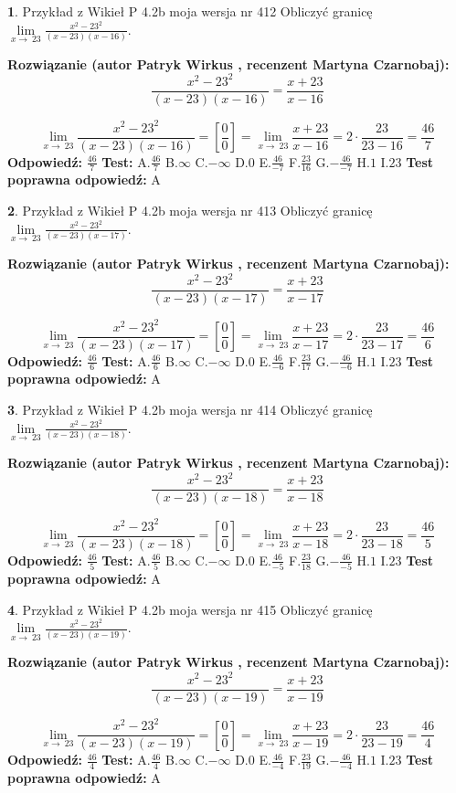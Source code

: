 \documentclass[12pt, a4paper]{article}
\theoremstyle{definition} %
\newtheorem{zad}{}
\newcommand{\zadStart}[1]{\begin{zad}#1\newline}
\newcommand{\zadStop}{\end{zad}}
\newcommand{\rozwStart}[2]{\noindent \textbf{Rozwiązanie (autor #1 , recenzent #2): }\newline}
\newcommand{\rozwStop}{\newline}
\newcommand{\odpStart}{\noindent \textbf{Odpowiedź:}\newline}
\newcommand{\odpStop}{\newline}
\newcommand{\testStart}{\noindent \textbf{Test:}\newline}
\newcommand{\testStop}{\newline}
\newcommand{\kluczStart}{\noindent \textbf{Test poprawna odpowiedź:}\newline}
\newcommand{\kluczStop}{\newline}
\begin{document}
\zadStart{Przykład z Wikieł P 4.2b moja wersja nr 412}
Obliczyć granicę $\lim\limits_{x\to\ 23}\frac{x^{2}-23^{2}}{(x-23)(x-16)}$.
\zadStop
\rozwStart{Patryk Wirkus}{Martyna Czarnobaj}
$$\frac{x^{2}-23^{2}}{(x-23)(x-16)}=\frac{x+23}{x-16}$$

$$\lim\limits_{x\to\ 23}\frac{x^{2}-23^{2}}{(x-23)(x-16)}=[\frac{0}{0}]=\lim\limits_{x\to\ 23}\frac{x+23}{x-16}=2 \cdot \frac{23}{23-16} = \frac{46}{7}$$
\rozwStop
\odpStart
$\frac{46}{7}$
\odpStop
\testStart
A.$\frac{46}{7}$
B.$\infty$
C.$-\infty$
D.$0$
E.$\frac{46}{-7}$
F.$\frac{23}{16}$
G.$-\frac{46}{-7}$
H.$1$
I.$23$
\testStop
\kluczStart
A
\kluczStop



\zadStart{Przykład z Wikieł P 4.2b moja wersja nr 413}
Obliczyć granicę $\lim\limits_{x\to\ 23}\frac{x^{2}-23^{2}}{(x-23)(x-17)}$.
\zadStop
\rozwStart{Patryk Wirkus}{Martyna Czarnobaj}
$$\frac{x^{2}-23^{2}}{(x-23)(x-17)}=\frac{x+23}{x-17}$$

$$\lim\limits_{x\to\ 23}\frac{x^{2}-23^{2}}{(x-23)(x-17)}=[\frac{0}{0}]=\lim\limits_{x\to\ 23}\frac{x+23}{x-17}=2 \cdot \frac{23}{23-17} = \frac{46}{6}$$
\rozwStop
\odpStart
$\frac{46}{6}$
\odpStop
\testStart
A.$\frac{46}{6}$
B.$\infty$
C.$-\infty$
D.$0$
E.$\frac{46}{-6}$
F.$\frac{23}{17}$
G.$-\frac{46}{-6}$
H.$1$
I.$23$
\testStop
\kluczStart
A
\kluczStop



\zadStart{Przykład z Wikieł P 4.2b moja wersja nr 414}
Obliczyć granicę $\lim\limits_{x\to\ 23}\frac{x^{2}-23^{2}}{(x-23)(x-18)}$.
\zadStop
\rozwStart{Patryk Wirkus}{Martyna Czarnobaj}
$$\frac{x^{2}-23^{2}}{(x-23)(x-18)}=\frac{x+23}{x-18}$$

$$\lim\limits_{x\to\ 23}\frac{x^{2}-23^{2}}{(x-23)(x-18)}=[\frac{0}{0}]=\lim\limits_{x\to\ 23}\frac{x+23}{x-18}=2 \cdot \frac{23}{23-18} = \frac{46}{5}$$
\rozwStop
\odpStart
$\frac{46}{5}$
\odpStop
\testStart
A.$\frac{46}{5}$
B.$\infty$
C.$-\infty$
D.$0$
E.$\frac{46}{-5}$
F.$\frac{23}{18}$
G.$-\frac{46}{-5}$
H.$1$
I.$23$
\testStop
\kluczStart
A
\kluczStop



\zadStart{Przykład z Wikieł P 4.2b moja wersja nr 415}
Obliczyć granicę $\lim\limits_{x\to\ 23}\frac{x^{2}-23^{2}}{(x-23)(x-19)}$.
\zadStop
\rozwStart{Patryk Wirkus}{Martyna Czarnobaj}
$$\frac{x^{2}-23^{2}}{(x-23)(x-19)}=\frac{x+23}{x-19}$$

$$\lim\limits_{x\to\ 23}\frac{x^{2}-23^{2}}{(x-23)(x-19)}=[\frac{0}{0}]=\lim\limits_{x\to\ 23}\frac{x+23}{x-19}=2 \cdot \frac{23}{23-19} = \frac{46}{4}$$
\rozwStop
\odpStart
$\frac{46}{4}$
\odpStop
\testStart
A.$\frac{46}{4}$
B.$\infty$
C.$-\infty$
D.$0$
E.$\frac{46}{-4}$
F.$\frac{23}{19}$
G.$-\frac{46}{-4}$
H.$1$
I.$23$
\testStop
\kluczStart
A
\kluczStop
\end{document}
